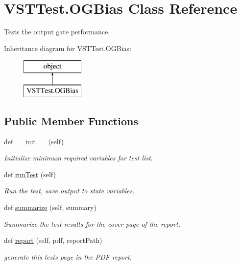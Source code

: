 \hypertarget{class_v_s_t_test_1_1_o_g_bias}{}\section{V\+S\+T\+Test.\+O\+G\+Bias Class Reference}
\label{class_v_s_t_test_1_1_o_g_bias}


Tests the output gate performance.  


Inheritance diagram for V\+S\+T\+Test.\+O\+G\+Bias\+:\begin{figure}[H]
\begin{center}
\leavevmode
\includegraphics[height=2.000000cm]{class_v_s_t_test_1_1_o_g_bias}
\end{center}
\end{figure}
\subsection*{Public Member Functions}
\begin{DoxyCompactItemize}
\item 
def \hyperlink{class_v_s_t_test_1_1_o_g_bias_a19178d7a25a2b5230d7fcafafd000bf8}{\+\_\+\+\_\+init\+\_\+\+\_\+} (self)
\begin{DoxyCompactList}\small\item\em Initialize minimum required variables for test list. \end{DoxyCompactList}\item 
def \hyperlink{class_v_s_t_test_1_1_o_g_bias_aefb7b7ad5ddbfab605045114759dce68}{run\+Test} (self)
\begin{DoxyCompactList}\small\item\em Run the test, save output to state variables. \end{DoxyCompactList}\item 
def \hyperlink{class_v_s_t_test_1_1_o_g_bias_a9014ca0149c4800680d56f8f999d6f3c}{summarize} (self, summary)
\begin{DoxyCompactList}\small\item\em Summarize the test results for the cover page of the report. \end{DoxyCompactList}\item 
def \hyperlink{class_v_s_t_test_1_1_o_g_bias_a0d87c66621884560f08a38ec98a36153}{report} (self, pdf, report\+Path)
\begin{DoxyCompactList}\small\item\em generate this test\textquotesingle{}s page in the P\+DF report. \end{DoxyCompactList}\end{DoxyCompactItemize}


